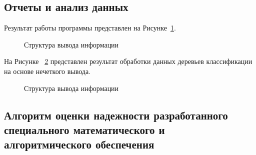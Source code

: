 \subsection{Отчеты и анализ данных}\label{subsec:ch3/sec2/sub3}
Результат работы программы представлен на Рисунке~\cref{fig:res}.
\begin{figure}[ht]
    \caption{Структура вывода информации}\label{fig:res}
\end{figure}
На Рисунке ~\cref{fig:res1} представлен результат обработки данных деревьев классификации на основе нечеткого вывода. 
\begin{figure}[ht]
    \caption{Структура вывода информации}\label{fig:res1}
\end{figure}

\subsection{Алгоритм оценки надежности разработанного специального математического и алгоритмического обеспечения}\label{sec:ch3/sec3/sub1}

